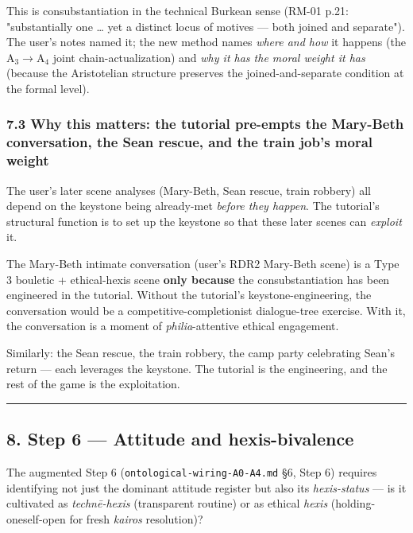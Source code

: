 \documentclass[11pt]{report}
\begin{document}
This is consubstantiation in the technical Burkean sense (RM-01 p.21: "substantially one … yet a distinct locus of motives — both joined and separate"). The user's notes named it; the new method names \textit{where and how} it happens (the A$_3$$\rightarrow$\allowbreak A$_4$ joint chain-actualization) and \textit{why it has the moral weight it has} (because the Aristotelian structure preserves the joined-and-separate condition at the formal level).


\subsubsection{7.3 Why this matters: the tutorial pre-empts the Mary-Beth conversation, the Sean rescue, and the train job's moral weight}


The user's later scene analyses (Mary-Beth, Sean rescue, train robbery) all depend on the keystone being already-met \textit{before they happen}. The tutorial's structural function is to set up the keystone so that these later scenes can \textit{exploit} it.


The Mary-Beth intimate conversation (user's RDR2 Mary-Beth scene) is a Type 3 bouletic + ethical-hexis scene \textbf{only because} the consubstantiation has been engineered in the tutorial. Without the tutorial's keystone-engineering, the conversation would be a competitive-completionist dialogue-tree exercise. With it, the conversation is a moment of \textit{philia}-attentive ethical engagement.


Similarly: the Sean rescue, the train robbery, the camp party celebrating Sean's return — each leverages the keystone. The tutorial is the engineering, and the rest of the game is the exploitation.


\vspace{0.4em}\hrule\vspace{0.8em}


\subsection{8. Step 6 — Attitude and hexis-bivalence}


The augmented Step 6 (\texttt{ontological-\discretionary{}{}{}wiring-\discretionary{}{}{}A0-\discretionary{}{}{}A4.\discretionary{}{}{}md} §6, Step 6) requires identifying not just the dominant attitude register but also its \textit{hexis-status} — is it cultivated as \textit{technē-hexis} (transparent routine) or as ethical \textit{hexis} (holding-oneself-open for fresh \textit{kairos} resolution)?
\end{document}
